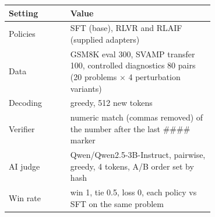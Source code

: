 \begin{tabular}{lp{0.70\linewidth}}
\toprule
Setting & Value \\
\midrule
Policies & SFT (base), RLVR and RLAIF (supplied adapters) \\
Data & GSM8K eval 300, SVAMP transfer 100, controlled diagnostics 80 pairs (20 problems $\times$ 4 perturbation variants) \\
Decoding & greedy, 512 new tokens \\
Verifier & numeric match (commas removed) of the number after the last \#\#\#\# marker \\
AI judge & Qwen/Qwen2.5-3B-Instruct, pairwise, greedy, 4 tokens, A/B order set by hash \\
Win rate & win 1, tie 0.5, loss 0, each policy vs SFT on the same problem \\
\bottomrule
\end{tabular}
